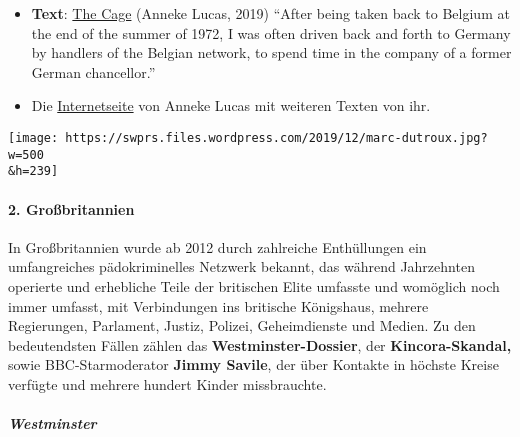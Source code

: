 \begin{itemize}
{  Little Spy} (Anneke Lucas, 2018, Archiv) ``I do know that I was
  transported quite often to Germany that year as the newly minted sex
  slave to the elite, and also for refinement of my training in the
  dirty lab. I was given to some top politicians.''
\item
  \textbf{Text}:
  \href{https://swprs.files.wordpress.com/2019/08/anneke-lucas-july-2019.pdf}{The
  Cage} (Anneke Lucas, 2019) ``After being taken back to Belgium at the
  end of the summer of 1972, I was often driven back and forth to
  Germany by handlers of the Belgian network, to spend time in the
  company of a former German chancellor.''
\item
  Die \href{https://annekelucas.com/writing}{Internetseite} von Anneke
  Lucas mit weiteren Texten von ihr.
\end{itemize}

\texttt{[image: https://swprs.files.wordpress.com/2019/12/marc-dutroux.jpg?w=500\\\&h=239]}

\hypertarget{2-grouxdfbritannien}{%
\paragraph{2. Großbritannien}\label{2-grouxdfbritannien}}

In Großbritannien wurde ab 2012 durch zahlreiche Enthüllungen ein
umfangreiches pädokriminelles Netzwerk bekannt, das während Jahrzehnten
operierte und erhebliche Teile der britischen Elite umfasste und
womöglich noch immer umfasst, mit Verbindungen ins britische Königshaus,
mehrere Regierungen, Parlament, Justiz, Polizei, Geheimdienste und
Medien. Zu den bedeutendsten Fällen zählen das
\textbf{Westminster-Dossier}, der \textbf{Kincora-Skandal,} sowie
BBC-Starmoderator \textbf{Jimmy Savile}, der über Kontakte in höchste
Kreise verfügte und mehrere hundert Kinder missbrauchte.

\hypertarget{westminster}{%
\subparagraph{\texorpdfstring{\textbf{Westminster}}{Westminster}}\label{westminster}}

